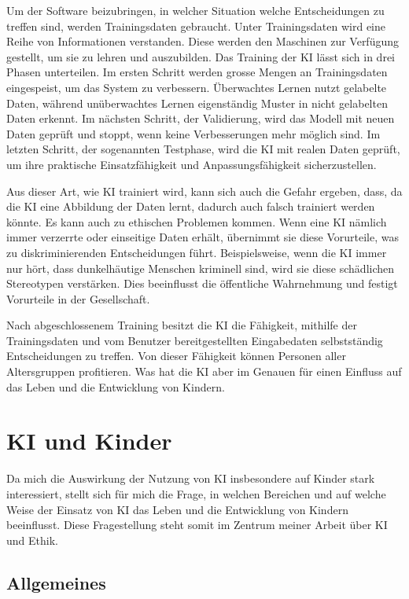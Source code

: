 \documentclass{report}
\begin{document}
Um der Software beizubringen, in welcher Situation welche Entscheidungen zu treffen sind, werden Trainingsdaten gebraucht. Unter Trainingsdaten wird eine Reihe von Informationen verstanden. Diese werden den Maschinen zur Verfügung gestellt, um sie zu lehren und auszubilden. 
Das Training der KI lässt sich in drei Phasen unterteilen. Im ersten Schritt werden grosse Mengen an Trainingsdaten eingespeist, um das System zu verbessern. Überwachtes Lernen nutzt gelabelte Daten, während unüberwachtes Lernen eigenständig Muster in nicht gelabelten Daten erkennt.
Im nächsten Schritt, der Validierung, wird das Modell mit neuen Daten geprüft und stoppt, wenn keine Verbesserungen mehr möglich sind. Im letzten Schritt, der sogenannten Testphase, wird die KI mit realen Daten geprüft, um ihre praktische Einsatzfähigkeit und Anpassungsfähigkeit sicherzustellen.

Aus dieser Art, wie KI trainiert wird, kann sich auch die Gefahr ergeben, dass, da die KI eine Abbildung der Daten lernt, dadurch auch falsch trainiert werden könnte. Es kann auch zu ethischen Problemen kommen.
Wenn eine KI nämlich immer verzerrte oder einseitige Daten erhält, übernimmt sie diese Vorurteile, was zu diskriminierenden Entscheidungen führt. Beispielsweise, wenn die KI immer nur hört, dass dunkelhäutige Menschen kriminell sind, wird sie diese schädlichen Stereotypen verstärken. Dies beeinflusst die öffentliche Wahrnehmung und festigt Vorurteile in der Gesellschaft.

Nach abgeschlossenem Training besitzt die KI die Fähigkeit, mithilfe der Trainingsdaten und vom Benutzer bereitgestellten Eingabedaten selbstständig Entscheidungen zu treffen. Von dieser Fähigkeit können Personen aller Altersgruppen profitieren. Was hat die KI aber im Genauen für einen Einfluss auf das Leben und die Entwicklung von Kindern.

\chapter{KI und Kinder}

Da mich die Auswirkung der Nutzung von KI insbesondere auf Kinder stark interessiert, stellt sich für mich die Frage, in welchen Bereichen und auf welche Weise der Einsatz von KI das Leben und die Entwicklung von Kindern beeinflusst. Diese Fragestellung steht somit im Zentrum meiner Arbeit über KI und Ethik.

\section{Allgemeines}
\end{document}
